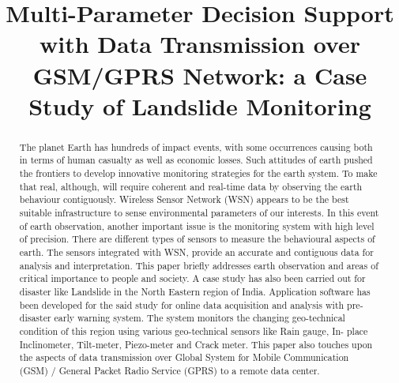 \documentclass[conference]{IEEEtran}
\begin{document}
\title{Multi-Parameter Decision Support with Data
Transmission over GSM/GPRS Network: a Case
Study of Landslide Monitoring}


\author{
}













\maketitle


\begin{abstract}
The planet Earth has hundreds of impact events,
with some occurrences causing both in terms of human casualty
as well as economic losses. Such attitudes of earth pushed the
frontiers to develop innovative monitoring strategies for the earth
system. To make that real, although, will require coherent and
real-time data by observing the earth behaviour contiguously.
Wireless Sensor Network (WSN) appears to be the best suitable
infrastructure to sense environmental parameters of our interests.
In this event of earth observation, another important issue is the
monitoring system with high level of precision. There are different
types of sensors to measure the behavioural aspects of earth. The
sensors integrated with WSN, provide an accurate and contiguous
data for analysis and interpretation. This paper briefly addresses
earth observation and areas of critical importance to people
and society. A case study has also been carried out for disaster
like Landslide in the North Eastern region of India. Application
software has been developed for the said study for online data
acquisition and analysis with pre-disaster early warning system.
The system monitors the changing geo-technical condition of this
region using various geo-technical sensors like Rain gauge, In-
place Inclinometer, Tilt-meter, Piezo-meter and Crack meter.
This paper also touches upon the aspects of data transmission
over Global System for Mobile Communication (GSM) / General
Packet Radio Service (GPRS) to a remote data center.
\end{abstract}
\end{document}
